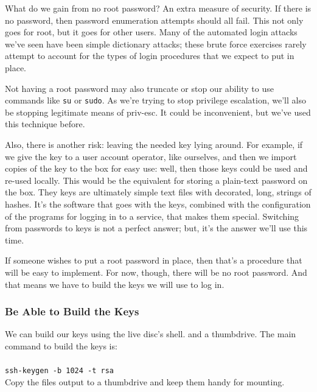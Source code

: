 What do we gain from no root \gls{password}?  An extra measure of security.  If there is no \gls{password}, then \gls{password} enumeration attempts should all fail.  This not only goes for root, but it goes for other users.  Many of the automated login attacks we've seen have been simple dictionary attacks; these brute force exercises rarely attempt to account for the types of login procedures that we expect to put in place.

Not having a root \gls{password} may also truncate or stop our ability to use commands like \texttt{su} or \texttt{sudo}.  As we're trying to stop privilege escalation, we'll also be stopping legitimate means of priv-esc.  It could be inconvenient, but we've used this technique before.

Also, there is another risk:  leaving the needed key lying around.  For example, if we give the key to a user account operator, like ourselves, and then we import copies of the key to the box for easy use:  well, then those keys could be used and re-used locally.  This would be the equivalent for storing a plain-text \gls{password} on the box.  They keys are ultimately simple text files with decorated, long, strings of hashes.  It's the software that goes with the keys, combined with the \gls{configuration} of the prog\gls{ram}s for logging in to a service, that makes them special.  Switching from passwords to keys is not a perfect answer; but, it's the answer we'll use this time.

If someone wishes to put a root \gls{password} in place, then that's a procedure that will be easy to implement.  For now, though, there will be no root \gls{password}.  And that means we have to build the keys we will use to log in.

\subsubsection{Be Able to Build the Keys}
We can build our keys using the live disc's  \gls{shell}. and a  \gls{thumbdrive}.  The main command to build the keys is:\\\\
\texttt{ssh-keygen -b 1024 -t rsa}\\

Copy the files output to a  \gls{thumbdrive} and keep them handy for mounting.

